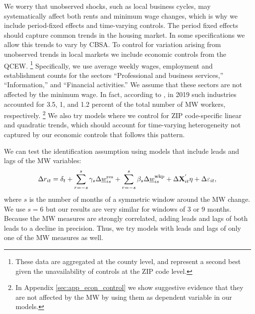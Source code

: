 We worry that unobserved shocks, such as local business cycles, may 
systematically affect both rents and minimum wage changes, which is why
we include period-fixed effects and time-varying controls.
The period fixed effects should capture common trends in the housing market.
In some specifications we allow this trends to vary by CBSA.
To control for variation arising from unobserved trends in local markets we 
include economic controls from the QCEW.%
\footnote{These data are aggregated at the county level, and represent a second best given the 
unavailability of controls at the ZIP code level.}
Specifically, we use average weekly wages, employment and establishment counts 
for the sectors ``Professional and business services,'' ``Information,'' and 
``Financial activities.''
We assume that these sectors are not affected by the minimum wage.
In fact, according to \textcite[][table 5]{MinWorkersReportBLS}, in 2019 
such industries accounted for 3.5, 1, and 1.2 percent of the total number of MW workers, 
respectively.%
\footnote{In Appendix \ref{sec:app_econ_control} we show suggestive evidence 
that they are not affected by the MW by using them as dependent variable in our 
models.}
We also try models where we control for ZIP code-specific linear and quadratic 
trends, which should account for time-varying heterogeneity not captured by our 
economic controls that follows this pattern.

We can test the identification assumption using models that include leads and lags
of the MW variables:
\begin{equation} \label{eq:leads_lags}
    \Delta r_{it} = \delta_t
                  + \sum_{r=-s}^{s} \gamma_s \Delta \underline{w}^{\text{res}}_{is} 
                  + \sum_{r=-s}^{s} \beta_s \Delta \underline{w}^{\text{wkp}}_{is}
                  + \Delta \mathbf{X}^{'}_{it}\eta
                  + \Delta \varepsilon_{it} ,
\end{equation}
where $s$ is the number of months of a symmetric window around the MW change. 
We use $s=6$ but our results are very similar for windows of 3 or 9 months.
Because the MW measures are strongly correlated, adding leads and lags of both 
leads to a decline in precision.
Thus, we try models with leads and lags of only one of the MW measures as well.

